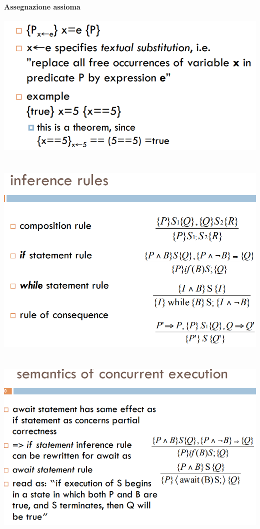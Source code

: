 \documentclass[10pt,a4paper]{book}
\begin{document}
\paragraph{Assegnazione assioma\\}
\includegraphics[scale=0.45]{img/ax.png} \\ \\ \\
\includegraphics[scale=0.45]{img/inference.png} \\ \\ \\
\includegraphics[scale=0.45]{img/inf2.png} \\ \\ \\
\end{document}
